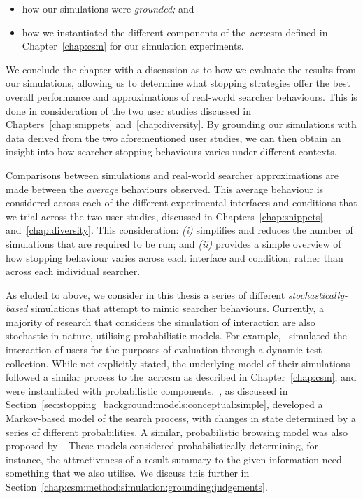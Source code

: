 \begin{itemize}
    \item{how our simulations were \emph{grounded;} and}
    \item{how we instantiated the different components of the~\gls{acr:csm} defined in Chapter~\ref{chap:csm} for our simulation experiments.}
\end{itemize}

We conclude the chapter with a discussion as to how we evaluate the results from our simulations, allowing us to determine what stopping strategies offer the best overall performance and approximations of real-world searcher behaviours. This is done in consideration of the two user studies discussed in Chapters~\ref{chap:snippets} and~\ref{chap:diversity}. By grounding our simulations with data derived from the two aforementioned user studies, we can then obtain an insight into how searcher stopping behaviours varies under different contexts.

 Comparisons between simulations and real-world searcher approximations are made between the \emph{average} behaviours observed. This average behaviour is considered across each of the different experimental interfaces and conditions that we trial across the two user studies, discussed in Chapters~\ref{chap:snippets} and~\ref{chap:diversity}. This consideration: \emph{(i)} simplifies and reduces the number of simulations that are required to be run; and \emph{(ii)} provides a simple overview of how stopping behaviour varies across each interface and condition, rather than across each individual searcher.

 As eluded to above, we consider in this thesis a series of different \emph{stochastically-based} simulations that attempt to mimic searcher behaviours. Currently, a majority of research that considers the simulation of interaction are also stochastic in nature, utilising probabilistic models. For example,~\cite{carterette2011effectiveness_evaluation} simulated the interaction of users for the purposes of evaluation through a dynamic test collection. While not explicitly stated, the underlying model of their simulations followed a similar process to the~\gls{acr:csm} as described in Chapter~\ref{chap:csm}, and were instantiated with probabilistic components.~\cite{baskaya2013behavioural_factors}, as discussed in Section~\ref{sec:stopping_background:models:conceptual:simple}, developed a Markov-based model of the search process, with changes in state determined by a series of different probabilities. A similar, probabilistic browsing model was also proposed by~\cite{yilmaz2010browsing_utility}. These models considered probabilistically determining, for instance, the attractiveness of a result summary to the given information need -- something that we also utilise. We discuss this further in Section~\ref{chap:csm:method:simulation:grounding:judgements}.


